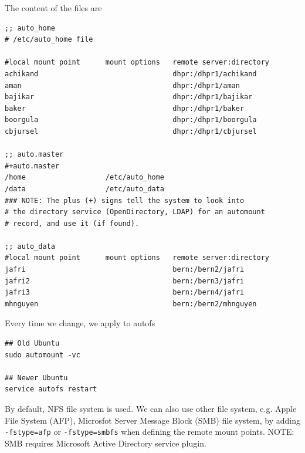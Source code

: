 The content of the files are
\begin{verbatim}
;; auto_home
# /etc/auto_home file

#local mount point      mount options   remote server:directory
achikand                                dhpr:/dhpr1/achikand
aman                                    dhpr:/dhpr1/aman
bajikar                                 dhpr:/dhpr1/bajikar
baker                                   dhpr:/dhpr1/baker
boorgula                                dhpr:/dhpr1/boorgula
cbjursel                                dhpr:/dhpr1/cbjursel

;; auto.master
#+auto.master
/home                   /etc/auto_home
/data                   /etc/auto_data
### NOTE: The plus (+) signs tell the system to look into
# the directory service (OpenDirectory, LDAP) for an automount
# record, and use it (if found).

;; auto_data
#local mount point      mount options   remote server:directory
jafri                                   bern:/bern2/jafri
jafri2                                  bern:/bern3/jafri
jafri3                                  bern:/bern4/jafri
mhnguyen                                bern:/bern2/mhnguyen
\end{verbatim}


Every time we change, we apply to autofs
\begin{verbatim}
## Old Ubuntu
sudo automount -vc

## Newer Ubuntu
service autofs restart
\end{verbatim}
By default, NFS file system is used. We can also use other file system, e.g.
Apple File System (AFP), Microsfot Server Message Block (SMB) file system, by
adding \verb!-fstype=afp! or \verb!-fstype=smbfs! when defining the remote mount
points. NOTE: SMB requires Microsoft Active Directory service plugin.


